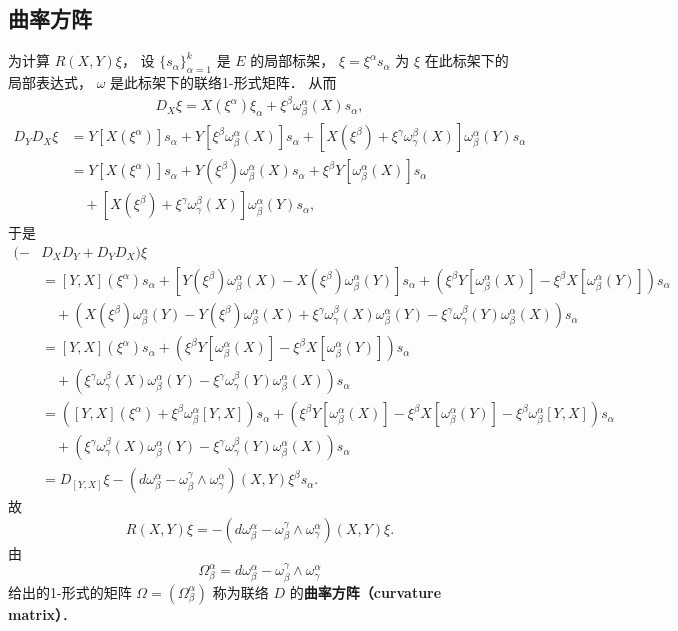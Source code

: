 \subsection{曲率方阵}
为计算 $R(X,Y)\xi$， 设 $\{s_\alpha\}_{\alpha=1}^k$ 是 $E$ 的局部标架， $\xi=\xi^\alpha s_\alpha$ 为 $\xi$ 在此标架下的局部表达式， $\omega$ 是此标架下的联络1-形式矩阵． 从而
$$
\begin{aligned}
D_X\xi=X(\xi^\alpha)\xi_\alpha+\xi^\beta\omega_\beta^\alpha(X) s_\alpha,
\end{aligned}
$$
$$
\begin{aligned}
D_YD_X\xi&=Y[X(\xi^\alpha)]s_\alpha+Y[\xi^\beta\omega_\beta^\alpha(X)] s_\alpha
+[X(\xi^\beta)+\xi^\gamma\omega_\gamma^\beta(X)]\omega_\beta^\alpha(Y) s_\alpha \\
&=Y[X(\xi^\alpha)]s_\alpha+Y(\xi^\beta)\omega_\beta^\alpha(X)s_\alpha+\xi^\beta Y[\omega_\beta^\alpha(X)]s_\alpha\\
&\quad+[X(\xi^\beta)+\xi^\gamma\omega_\gamma^\beta(X)]\omega_\beta^\alpha(Y) s_\alpha ,
\end{aligned}
$$
于是
$$
\begin{aligned}
(-&D_XD_Y+D_YD_X)\xi\\
&=[Y,X](\xi^\alpha)s_\alpha
+[Y(\xi^\beta)\omega_\beta^\alpha(X)-X(\xi^\beta)\omega_\beta^\alpha(Y)]s_\alpha+\left(\xi^\beta Y[\omega_\beta^\alpha(X)]-\xi^\beta X[\omega_\beta^\alpha(Y)]\right)s_\alpha\\
&\quad+\left(X(\xi^\beta)\omega_\beta^\alpha(Y)-Y(\xi^\beta)\omega_\beta^\alpha(X)+\xi^\gamma\omega_\gamma^\beta(X)\omega_\beta^\alpha(Y)-\xi^\gamma\omega_\gamma^\beta(Y)\omega_\beta^\alpha(X) \right)s_\alpha\\
&=[Y,X](\xi^\alpha)s_\alpha+\left(\xi^\beta Y[\omega_\beta^\alpha(X)]-\xi^\beta X[\omega_\beta^\alpha(Y)]\right)s_\alpha\\
&\quad+\left(\xi^\gamma\omega_\gamma^\beta(X)\omega_\beta^\alpha(Y)-\xi^\gamma\omega_\gamma^\beta(Y)\omega_\beta^\alpha(X) \right)s_\alpha\\
&=\left([Y,X](\xi^\alpha)+\xi^\beta\omega_\beta^\alpha[Y,X]\right)s_\alpha
+\left(\xi^\beta Y[\omega_\beta^\alpha(X)]-\xi^\beta X[\omega_\beta^\alpha(Y)]-\xi^\beta\omega_\beta^\alpha[Y,X]\right)s_\alpha\\
&\quad+\left(\xi^\gamma\omega_\gamma^\beta(X)\omega_\beta^\alpha(Y)-\xi^\gamma\omega_\gamma^\beta(Y)\omega_\beta^\alpha(X) \right)s_\alpha\\
&=D_{[Y,X]}\xi-(d\omega_\beta^\alpha-\omega_\beta^\gamma\wedge\omega_\gamma^\alpha)(X,Y)\xi^\beta s_\alpha.
\end{aligned}
$$
故
$$
R(X,Y)\xi=-(d\omega_\beta^\alpha-\omega_\beta^\gamma\wedge\omega_\gamma^\alpha)(X,Y)\xi.
$$
由
$$
\Omega_\beta^\alpha=d\omega_\beta^\alpha-\omega_\beta^\gamma\wedge\omega_\gamma^\alpha
$$
给出的1-形式的矩阵 $\Omega=(\Omega_\beta^\alpha)$ 称为联络 $D$ 的\textbf{曲率方阵（curvature matrix）}． 

